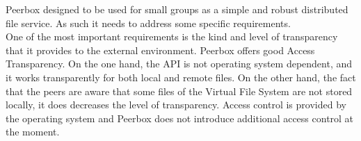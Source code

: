 
Peerbox designed to be used for small groups as a simple and robust distributed file service. As such it needs to address some specific requirements.\\

One of the most important requirements is the kind and level of transparency that it provides to the external environment. Peerbox offers good Access Transparency. On the one hand, the API is not operating system dependent, and it works transparently for both local and remote files. On the other hand, the fact that the peers are aware that some files of the Virtual File System are not stored locally, it does decreases the level of transparency. Access control is provided by the operating system and Peerbox does not introduce additional access control at the moment.



%





 
 






% 





%






